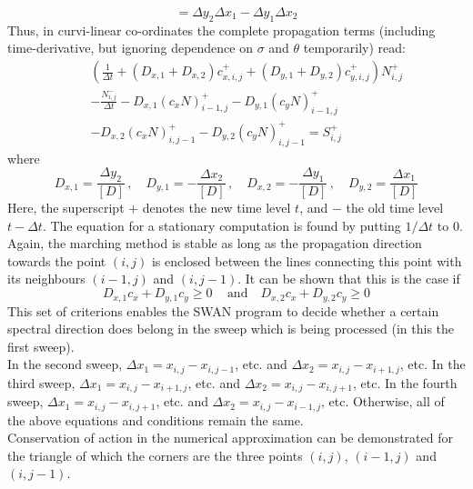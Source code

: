 \documentclass[12pt]{book}
\begin{document}
\begin{equation}
  [D] = \Delta y_2 \Delta x_1 - \Delta y_1 \Delta x_2
\end{equation}
Thus, in curvi-linear co-ordinates the complete propagation terms (including time-derivative, but ignoring dependence on $\sigma$ and $\theta$ temporarily) read:
\begin{eqnarray}
  && \left ( \frac{1}{\Delta t} + (D_{x,1} + D_{x,2})c_{x,i,j}^+ + (D_{y,1}+D_{y,2}) c_{y,i,j}^+ \right ) N_{i,j}^+ \nonumber \\
  && - \frac{N_{i,j}^-}{\Delta t} - D_{x,1} (c_x N)_{i-1,j}^+ - D_{y,1} (c_y N)_{i-1,j}^+ \nonumber \\
  && - D_{x,2} (c_x N)_{i,j-1}^+ - D_{y,2} (c_y N)_{i,j-1}^+ = S_{i,j}^+
\end{eqnarray}
where
\begin{equation}
  D_{x,1} = \frac{\Delta y_2}{[D]} \, , \quad
  D_{y,1} = -\frac{\Delta x_2}{[D]} \, , \quad
  D_{x,2} = -\frac{\Delta y_1}{[D]} \, , \quad
  D_{y,2} = \frac{\Delta x_1}{[D]}
\end{equation}
Here, the superscript $+$ denotes the new time level $t$, and $-$ the old time level $t-\Delta t$. The equation for a stationary computation is found
by putting $1/\Delta t$ to 0.
\\[2ex]
Again, the marching method is stable as long as the propagation direction towards the point $(i,j)$ is enclosed between the lines connecting this point
with its neighbours $(i-1,j)$ and $(i,j-1)$. It can be shown that this is the case if
\begin{equation}
  D_{x,1}c_x + D_{y,1}c_y \geq 0\, \quad \mbox{and} \quad D_{x,2}c_x + D_{y,2}c_y \geq 0
\end{equation}
This set of criterions enables the SWAN program to decide whether a certain spectral direction does belong in the sweep which is being processed (in
this the first sweep).
\\[2ex]
In the second sweep, $\Delta x_1 = x_{i,j} - x_{i,j-1}$, etc. and $\Delta x_2 = x_{i,j} - x_{i+1,j}$, etc. In the third sweep,
$\Delta x_1 = x_{i,j} - x_{i+1,j}$, etc. and $\Delta x_2 = x_{i,j} - x_{i,j+1}$, etc. In the fourth sweep,
$\Delta x_1 = x_{i,j} - x_{i,j+1}$, etc. and $\Delta x_2 = x_{i,j} - x_{i-1,j}$, etc. Otherwise, all of the above equations and conditions remain
the same.
\\[2ex]
Conservation of action in the numerical approximation can be demonstrated for the triangle of which the corners are the three points $(i,j)$, $(i-1,j)$ and $(i,j-1)$.
\end{document}
